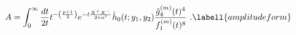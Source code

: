 \begin{equation}
  A = \int_0^\infty \frac{dt}{2t} t^{-\left(\frac{p+1}{2}\right)}e^{- t\frac{X^+ X^-}{2\pi\alpha'}}
 \hat{h}_0({t};y_1,y_2) \frac{\hat{g}_4^{({m})}({t})^4}
  {f_1^{({m})}({t})^8}\ .
\labell{amplitudeform}
\end{equation}

